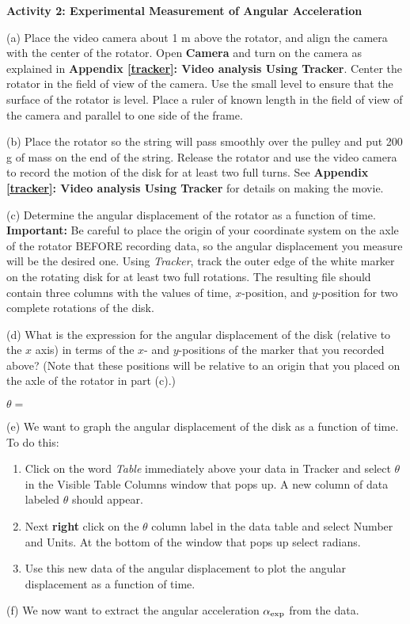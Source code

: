 \textbf{Activity 2: Experimental Measurement of Angular Acceleration} 

(a) Place the video camera about 1 m above the rotator, and align the camera with the 
center of the rotator. Open \textbf{Camera} and turn on the camera as explained in \textbf{Appendix \ref{tracker}: Video analysis Using Tracker}. Center the rotator in the 
field of view of the camera. Use the small level to ensure that the surface of the rotator 
is level. Place a ruler of known length in the field of view of the camera and parallel to 
one side of the frame.

(b) Place the rotator so the string will pass smoothly over the pulley and put
200 g of mass on the end of the string. Release the rotator and use the
video camera to record the motion of the disk for at least two full turns. See  
\textbf{Appendix \ref{tracker}: Video analysis Using Tracker} for details on 
making the movie.

(c) Determine the angular displacement of the rotator as a function of time. \textbf{Important:} Be careful to place the origin of your coordinate system on the axle of the rotator BEFORE recording data, so the angular displacement you measure will be the desired one. Using \textit{Tracker}, track the outer edge of the white marker on the rotating disk for at least two full rotations. The resulting file should contain three columns with the values of time, $x$-position, and $y$-position for two complete rotations of the disk.

\pagebreak[2]
(d) What is the expression for the angular displacement of the disk (relative to the $x$ axis) in terms of the $x$- and $y$-positions of the marker that you recorded above? (Note that these positions will be relative to an origin that you placed on the axle of the rotator in part (c).)
\vspace{5mm}

\hspace{0.5in}\( \theta  =\)
\answerspace{5mm}

\pagebreak[2]
(e) We want to graph the angular displacement of the disk as a function of time.
To do this:

\begin{enumerate}
\item Click on the word {\it Table} immediately above your data in Tracker and select \( \theta \) in the Visible Table Columns window that pops up.  A new column of data labeled \( \theta \) should appear.

\item Next {\bf right} click on the \( \theta \) column label in the data table and select Number and Units.  At the bottom of the window that pops up select radians. 

\item  Use this new data of the angular displacement to plot the angular displacement as a function of time. 

\end{enumerate}
\pagebreak
(f) We now want to extract the angular acceleration $\alpha _{\rm exp}$ from the data.

